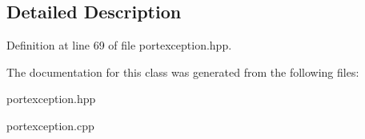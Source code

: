 \subsection{Detailed Description}


Definition at line 69 of file portexception.\+hpp.



The documentation for this class was generated from the following files\+:\begin{DoxyCompactItemize}
\item 
portexception.\+hpp\item 
portexception.\+cpp\end{DoxyCompactItemize}
